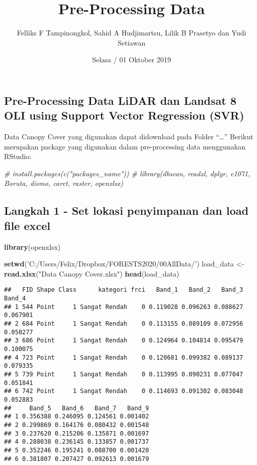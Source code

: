 \documentclass[]{article}
\title{Pre-Processing Data}
\author{Felliks F Tampinongkol, Sahid A Hudjimartsu, Lilik B Prasetyo dan Yudi
Setiawan}
\date{Selasa / 01 Oktober 2019}
\newenvironment{Shaded}{\begin{snugshade}}{\end{snugshade}}
\newcommand{\KeywordTok}[1]{\textcolor[rgb]{0.13,0.29,0.53}{\textbf{#1}}}
\newcommand{\StringTok}[1]{\textcolor[rgb]{0.31,0.60,0.02}{#1}}
\newcommand{\CommentTok}[1]{\textcolor[rgb]{0.56,0.35,0.01}{\textit{#1}}}
\newcommand{\NormalTok}[1]{#1}
\begin{document}
\maketitle

\subsection{Pre-Processing Data LiDAR dan Landsat 8 OLI using Support
Vector Regression
(SVR)}\label{pre-processing-data-lidar-dan-landsat-8-oli-using-support-vector-regression-svr}

Data Canopy Cover yang digunakan dapat didownload pada Folder
``\ldots{}'' Berikut merupakan package yang digunakan dalam
pre-processing data menggunakan RStudio:

\begin{Shaded}
\begin{Highlighting}[]
\CommentTok{# install.packages(c("packages_name"))}
\CommentTok{# library(dbscan, readxl, dplyr, e1071, Boruta, dismo, caret, raster, openxlsx)}
\end{Highlighting}
\end{Shaded}

\subsection{Langkah 1 - Set lokasi penyimpanan dan load file
excel}\label{langkah-1---set-lokasi-penyimpanan-dan-load-file-excel}

\begin{Shaded}
\begin{Highlighting}[]
\KeywordTok{library}\NormalTok{(openxlsx)}

\KeywordTok{setwd}\NormalTok{(}\StringTok{'C:/Users/Felix/Dropbox/FORESTS2020/00AllData/'}\NormalTok{)}
\NormalTok{load_data <-}\StringTok{ }\KeywordTok{read.xlsx}\NormalTok{(}\StringTok{"Data Canopy Cover.xlsx"}\NormalTok{)}
\KeywordTok{head}\NormalTok{(load_data)}
\end{Highlighting}
\end{Shaded}

\begin{verbatim}
##   FID Shape Class      kategori frci   Band_1   Band_2   Band_3   Band_4
## 1 544 Point     1 Sangat Rendah    0 0.119028 0.096263 0.088627 0.067901
## 2 684 Point     1 Sangat Rendah    0 0.113155 0.089109 0.072956 0.050277
## 3 686 Point     1 Sangat Rendah    0 0.124964 0.104814 0.095479 0.100075
## 4 723 Point     1 Sangat Rendah    0 0.120681 0.099382 0.089137 0.079335
## 5 739 Point     1 Sangat Rendah    0 0.113995 0.090231 0.077047 0.051841
## 6 742 Point     1 Sangat Rendah    0 0.114693 0.091302 0.083048 0.052883
##     Band_5   Band_6   Band_7   Band_9
## 1 0.356388 0.246095 0.124561 0.001402
## 2 0.299869 0.164176 0.080432 0.001548
## 3 0.237620 0.215206 0.135871 0.001697
## 4 0.288038 0.236145 0.133857 0.001737
## 5 0.352246 0.195241 0.088700 0.001420
## 6 0.381807 0.207427 0.092613 0.001679
\end{verbatim}
\end{document}
